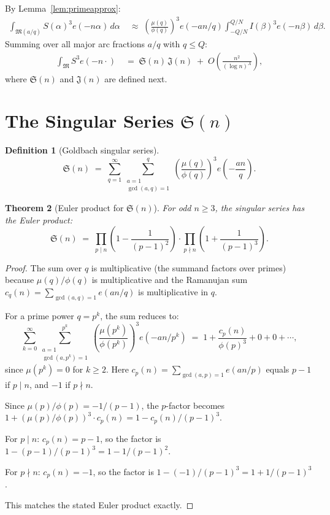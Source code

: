 \documentclass[12pt,a4paper]{amsart}
\newtheorem{theorem}{Theorem}[section]
\theoremstyle{definition}
\newtheorem{definition}[theorem]{Definition}
\newcommand{\eq}[1]{e\!\left(#1\right)}
\begin{document}
By Lemma~\ref{lem:primeapprox}:
\begin{align*}
  \int_{\mathfrak{M}(a/q)} S(\alpha)^3 \eq{-n\alpha}\, d\alpha
  &\;\approx\; \left(\frac{\mu(q)}{\phi(q)}\right)^3 \eq{-an/q}
               \int_{-Q/N}^{Q/N} I(\beta)^3 \eq{-n\beta}\, d\beta.
\end{align*}
Summing over all major arc fractions $a/q$ with $q \leq Q$:
\begin{align*}
  \int_{\mathfrak{M}} S^3 \eq{-n\cdot}
  &\;=\; \mathfrak{S}(n)\, \mathfrak{J}(n) \;+\; O\!\left(\frac{n^2}{(\log n)^A}\right),
\end{align*}
where $\mathfrak{S}(n)$ and $\mathfrak{J}(n)$ are defined next.

\section{The Singular Series \texorpdfstring{$\mathfrak{S}(n)$}{S(n)}}
\label{sec:singular}

\begin{definition}[Goldbach singular series]
  \[
    \mathfrak{S}(n)
    \;=\; \sum_{q=1}^{\infty}
          \sum_{\substack{a=1\\ \gcd(a,q)=1}}^{q}
          \left(\frac{\mu(q)}{\phi(q)}\right)^3 \eq{-\frac{an}{q}}.
  \]
\end{definition}

\begin{theorem}[Euler product for $\mathfrak{S}(n)$]\label{thm:euler_prod}
  For odd $n \geq 3$, the singular series has the Euler product:
  \[
    \mathfrak{S}(n)
    \;=\; \prod_{p \mid n} \left(1 - \frac{1}{(p-1)^2}\right)
          \cdot \prod_{p \nmid n} \left(1 + \frac{1}{(p-1)^3}\right).
  \]
\end{theorem}

\begin{proof}
  The sum over $q$ is multiplicative (the summand factors over primes)
  because $\mu(q)/\phi(q)$ is multiplicative and the Ramanujan sum
  $c_q(n) = \sum_{\gcd(a,q)=1} \eq{an/q}$ is multiplicative in $q$.

  For a prime power $q = p^k$, the sum reduces to:
  \[
    \sum_{k=0}^{\infty} \sum_{\substack{a=1\\ \gcd(a,p^k)=1}}^{p^k}
    \left(\frac{\mu(p^k)}{\phi(p^k)}\right)^3 \eq{-an/p^k}
    \;=\; 1 + \frac{c_p(n)}{\phi(p)^3} + 0 + 0 + \cdots,
  \]
  since $\mu(p^k) = 0$ for $k \geq 2$.  Here $c_p(n) = \sum_{\gcd(a,p)=1} \eq{an/p}$
  equals $p-1$ if $p \mid n$, and $-1$ if $p \nmid n$.

  Since $\mu(p)/\phi(p) = -1/(p-1)$, the $p$-factor becomes
  $1 + (\mu(p)/\phi(p))^3 \cdot c_p(n) = 1 - c_p(n)/(p-1)^3$.

  For $p \mid n$: $c_p(n) = p-1$, so the factor is
  $1 - (p-1)/(p-1)^3 = 1 - 1/(p-1)^2$.

  For $p \nmid n$: $c_p(n) = -1$, so the factor is
  $1 - (-1)/(p-1)^3 = 1 + 1/(p-1)^3$.

  This matches the stated Euler product exactly.
\end{proof}
\end{document}

